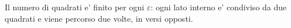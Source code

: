 \documentclass[preview]{standalone}
\begin{document}
\begin{center}
Il numero di quadrati e' finito per ogni $\varepsilon$: ogni lato interno e' condiviso da due quadrati e viene percorso due volte, in versi opposti.
\end{center}
\end{document}
